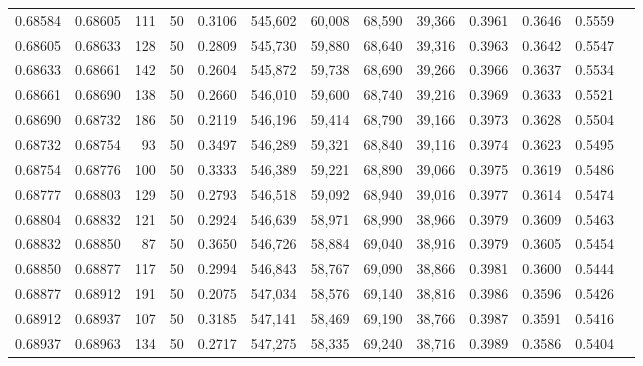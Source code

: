 \begin{tabular}{rrrrrrrrrrrrr}
0.68584 & 0.68605 &   111 &  50 &                                     0.3106 & 545,602 &  60,008 &  68,590 &  39,366 & 0.3961 & 0.3646 & 0.5559 \\
0.68605 & 0.68633 &   128 &  50 &                                     0.2809 & 545,730 &  59,880 &  68,640 &  39,316 & 0.3963 & 0.3642 & 0.5547 \\
0.68633 & 0.68661 &   142 &  50 &                                     0.2604 & 545,872 &  59,738 &  68,690 &  39,266 & 0.3966 & 0.3637 & 0.5534 \\
0.68661 & 0.68690 &   138 &  50 &                                     0.2660 & 546,010 &  59,600 &  68,740 &  39,216 & 0.3969 & 0.3633 & 0.5521 \\
0.68690 & 0.68732 &   186 &  50 &                                     0.2119 & 546,196 &  59,414 &  68,790 &  39,166 & 0.3973 & 0.3628 & 0.5504 \\
0.68732 & 0.68754 &    93 &  50 &                                     0.3497 & 546,289 &  59,321 &  68,840 &  39,116 & 0.3974 & 0.3623 & 0.5495 \\
0.68754 & 0.68776 &   100 &  50 &                                     0.3333 & 546,389 &  59,221 &  68,890 &  39,066 & 0.3975 & 0.3619 & 0.5486 \\
0.68777 & 0.68803 &   129 &  50 &                                     0.2793 & 546,518 &  59,092 &  68,940 &  39,016 & 0.3977 & 0.3614 & 0.5474 \\
0.68804 & 0.68832 &   121 &  50 &                                     0.2924 & 546,639 &  58,971 &  68,990 &  38,966 & 0.3979 & 0.3609 & 0.5463 \\
0.68832 & 0.68850 &    87 &  50 &                                     0.3650 & 546,726 &  58,884 &  69,040 &  38,916 & 0.3979 & 0.3605 & 0.5454 \\
0.68850 & 0.68877 &   117 &  50 &                                     0.2994 & 546,843 &  58,767 &  69,090 &  38,866 & 0.3981 & 0.3600 & 0.5444 \\
0.68877 & 0.68912 &   191 &  50 &                                     0.2075 & 547,034 &  58,576 &  69,140 &  38,816 & 0.3986 & 0.3596 & 0.5426 \\
0.68912 & 0.68937 &   107 &  50 &                                     0.3185 & 547,141 &  58,469 &  69,190 &  38,766 & 0.3987 & 0.3591 & 0.5416 \\
0.68937 & 0.68963 &   134 &  50 &                                     0.2717 & 547,275 &  58,335 &  69,240 &  38,716 & 0.3989 & 0.3586 & 0.5404 \\

\end{tabular}
